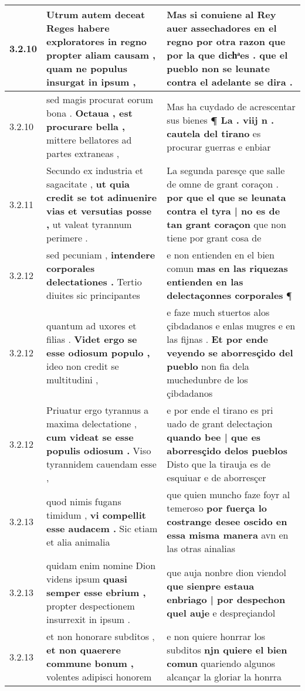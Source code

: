 \begin{tabular}{|p{1cm}|p{6.5cm}|p{6.5cm}|}
3.2.10 & Utrum autem deceat Reges \textbf{ habere exploratores in regno propter aliam causam , } quam ne populus insurgat in ipsum , & Mas si conuiene al Rey auer assechadores en el regno \textbf{ por otra razon que por la que dichͣes . } que el pueblo non se leunate contra el adelante se dira . \\\hline
3.2.10 & sed magis procurat eorum bona . \textbf{ Octaua , est procurare bella , } mittere bellatores ad partes extraneas , & Mas ha cuydado de acrescentar sus bienes \textbf{ ¶ La . viij n . cautela del tirano } es procurar guerras e enbiar \\\hline
3.2.11 & Secundo ex industria et sagacitate , \textbf{ ut quia credit se tot adinuenire vias et versutias posse , } ut valeat tyrannum perimere . & La segunda paresçe que salle de omne de grant coraçon . \textbf{ por que el que se leunata contra el tyra | no es de tan grant coraçon } que non tiene por grant cosa de \\\hline
3.2.12 & sed pecuniam , \textbf{ intendere corporales delectationes . } Tertio diuites sic principantes & e non entienden en el bien comun \textbf{ mas en las riquezas entienden en las delectaçonnes corporales } ¶ \\\hline
3.2.12 & quantum ad uxores et filias . \textbf{ Videt ergo se esse odiosum populo , } ideo non credit se multitudini , & e faze much stuertos alos çibdadanos e enlas mugres e en las fijnas . \textbf{ Et por ende veyendo se aborresçido del pueblo } non fia dela muchedunbre de los çibdadanos \\\hline
3.2.12 & Priuatur ergo tyrannus a maxima delectatione , \textbf{ cum videat se esse populis odiosum . } Viso tyrannidem cauendam esse , & e por ende el tirano es pri uado de grant delectaçion \textbf{ quando bee | que es aborresçido delos pueblos } Disto que la tirauja es de esquiuar e de aborresçer \\\hline
3.2.13 & quod nimis fugans timidum , \textbf{ vi compellit esse audacem . } Sic etiam et alia animalia & que quien muncho faze foyr al temeroso \textbf{ por fuerça lo costrange desee oscido en essa misma manera } avn en las otras ainalias \\\hline
3.2.13 & quidam enim nomine Dion videns ipsum \textbf{ quasi semper esse ebrium , } propter despectionem insurrexit in ipsum . & que auja nonbre dion viendol \textbf{ que sienpre estaua enbriago | por despechon quel auje } e despreçiandol \\\hline
3.2.13 & et non honorare subditos , \textbf{ et non quaerere commune bonum , } volentes adipisci honorem & e non quiere honrrar los subditos \textbf{ njn quiere el bien comun } quariendo algunos alcançar la gloriar la honrra \\\hline

\end{tabular}

